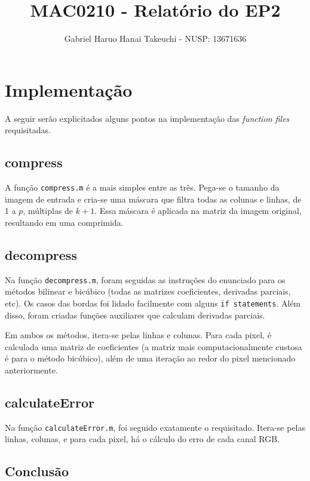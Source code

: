 \documentclass{article}
\author{Gabriel Haruo Hanai Takeuchi - NUSP: 13671636}
\title{MAC0210 - Relatório do EP2}
\date{}
\begin{document}
\maketitle

\section{Implementação}

A seguir serão explicitados alguns pontos na implementação das 
\textit{function files} requisitadas.

\subsection{compress}

A função \texttt{compress.m} é a mais simples entre as três. Pega-se o
tamanho da imagem de entrada e cria-se uma máscara que filtra todas as
colunas e linhas, de 1 a $p$, múltiplas de $k+1$. Essa máscara é aplicada
na matriz da imagem original, resultando em uma comprimida.

\subsection{decompress}

Na função \texttt{decompress.m}, foram seguidas as instruções do enunciado
para os métodos bilinear e bicúbico (todas as matrizes coeficientes,
derivadas parciais, etc). Os casos das bordas foi lidado facilmente com alguns
\texttt{if statements}. Além disso, foram criadas funções auxiliares que
calculam derivadas parciais.

Em ambos os métodos, itera-se pelas linhas e colunas. Para cada pixel,
é calculada uma matriz de coeficientes (a matriz mais computacionalmente
custosa é para o método bicúbico), além de uma iteração ao redor do pixel
mencionado anteriormente.

\subsection{calculateError}

Na função \texttt{calculateError.m}, foi seguido exatamente o requisitado.
Itera-se pelas linhas, colunas, e para cada pixel, há o cálculo do erro de
cada canal RGB. 

\subsection{Conclusão}
\end{document}
